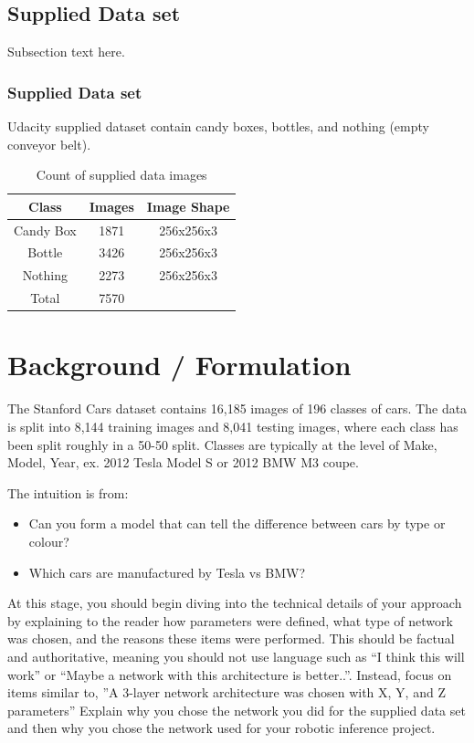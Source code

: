 \documentclass[10pt,journal,compsoc]{IEEEtran}
\begin{document}
\subsection{Supplied Data set}
Subsection text here.

\subsubsection{Supplied Data set}
Udacity supplied dataset contain candy boxes, bottles, and nothing (empty conveyor belt).

\begin{table}[h]
 \begin{center}
      \begin{tabular}{ |c|c|c| } 
       \hline
       Class & Images & Image Shape \\
       \hline
       Candy Box & 1871 & 256x256x3 \\ 
       Bottle & 3426 & 256x256x3 \\ 
       Nothing & 2273 & 256x256x3 \\
       \hline
       Total & 7570 & \\
       \hline
      \end{tabular}
      \caption{Count of supplied data images}
      \label{table:1}
      \end{center}
      \end{table}



   

\section{Background / Formulation}
The Stanford Cars dataset contains 16,185 images of 196 classes of cars. The data is split into 8,144 training images and 8,041 testing images, where each class has been split roughly in a 50-50 split. Classes are typically at the level of Make, Model, Year, ex. 2012 Tesla Model S or 2012 BMW M3 coupe.

 The intuition is from:

\begin{itemize}
\item Can you form a model that can tell the difference between cars by type or colour?
\item Which cars are manufactured by Tesla vs BMW?
\end {itemize}
 
At this stage, you should begin diving into the technical details of your approach by explaining to the reader how parameters were defined, what type of network was chosen, and the reasons these items were performed. This should be factual and authoritative, meaning you should not use language such as “I think this will work” or “Maybe a network with this architecture is better..”. Instead, focus on items similar to, ”A 3-layer network architecture was chosen with X, Y, and Z parameters” 
Explain why you chose the network you did for the supplied data set and then why you chose the network used for your robotic inference project. \cite{lamport1994latex}
\end{document}
